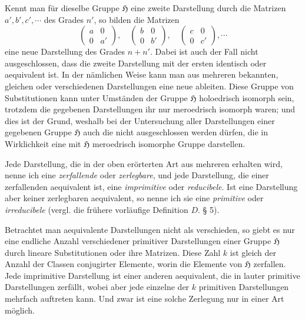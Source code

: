 \documentclass[11pt]{article}
\newcommand{\Hgr}{\mathfrak{H}}
\begin{document}
Kennt man für dieselbe Gruppe $\Hgr$ eine zweite Darstellung durch die Matrizen $a',b',c',\cdots$ des Grades $n'$, so bilden die Matrizen
\[
\begin{pmatrix}a&0\\0&a'\end{pmatrix},\quad
\begin{pmatrix}b&0\\0&b'\end{pmatrix},\quad
\begin{pmatrix}c&0\\0&c'\end{pmatrix},\cdots
\]
eine neue Darstellung des Grades $n+n'$. Dabei ist auch der Fall nicht ausgeschlossen, dass die zweite Darstellung mit der ersten identisch oder aequivalent ist. In der nämlichen Weise kann man aus mehreren bekannten, gleichen oder verschiedenen Darstellungen eine neue ableiten. Diese Gruppe von Substitutionen kann unter Umständen der Gruppe $\Hgr$ holoedrisch isomorph sein, trotzdem die gegebenen Darstellungen ihr nur meroedrisch isomorph waren; und dies ist der Grund, weshalb bei der Untersuchung aller Darstellungen einer gegebenen Gruppe $\Hgr$ auch die nicht ausgeschlossen werden dürfen, die in Wirklichkeit eine mit $\Hgr$ meroedrisch isomorphe Gruppe darstellen.

Jede Darstellung, die in der oben erörterten Art aus mehreren erhalten wird, nenne ich eine \emph{zerfallende} oder \emph{zerlegbare}, und jede Darstellung, die einer zerfallenden aequivalent ist, eine \emph{imprimitive} oder \emph{reducibele}. Ist eine Darstellung aber keiner zerlegbaren aequivalent, so nenne ich sie eine \emph{primitive} oder \emph{irreducibele} (vergl. die frühere vorläufige Definition $D.$ § 5).

Betrachtet man aequivalente Darstellungen nicht als verschieden, so giebt es nur eine endliche Anzahl verschiedener primitiver Darstellungen einer Gruppe $\Hgr$ durch lineare Substitutionen oder ihre Matrizen. Diese Zahl $k$ ist gleich der Anzahl der Classen conjugirter Elemente, worin die Elemente von $\Hgr$ zerfallen. Jede imprimitive Darstellung ist einer anderen aequivalent, die in lauter primitive Darstellungen zerfällt, wobei aber jede einzelne der $k$ primitiven Darstellungen mehrfach auftreten kann. Und zwar ist eine solche Zerlegung nur in einer Art möglich.
\end{document}
